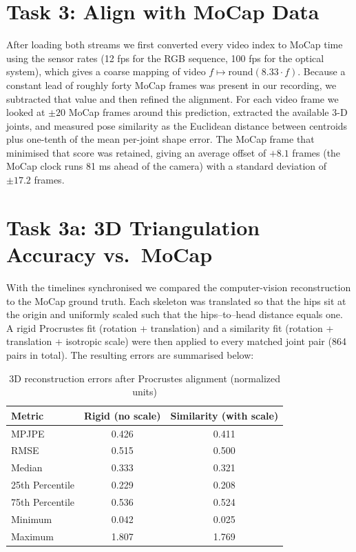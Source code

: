 \documentclass[11pt,a4paper]{article}
\begin{document}
\section*{Task 3: Align with MoCap Data}
After loading both streams we first converted every video index to MoCap time using the sensor rates (12 fps for the RGB sequence, 100 fps for the optical system), which gives a coarse mapping of video \(f \mapsto \mathrm{round}(8.33 \cdot f)\). Because a constant lead of roughly forty MoCap frames was present in our recording, we subtracted that value and then refined the alignment. For each video frame we looked at \(\pm 20\) MoCap frames around this prediction, extracted the available 3-D joints, and measured pose similarity as the Euclidean distance between centroids plus one-tenth of the mean per-joint shape error. The MoCap frame that minimised that score was retained, giving an average offset of \(+8.1\) frames (the MoCap clock runs 81 ms ahead of the camera) with a standard deviation of \(\pm 17.2\) frames.

\section*{Task 3a: 3D Triangulation Accuracy vs.\ MoCap}

With the timelines synchronised we compared the computer-vision reconstruction to the MoCap ground truth. Each skeleton was translated so that the hips sit at the origin and uniformly scaled such that the hips–to–head distance equals one. A rigid Procrustes fit (rotation + translation) and a similarity fit (rotation + translation + isotropic scale) were then applied to every matched joint pair (864 pairs in total). The resulting errors are summarised below:

\begin{table}[htbp]
  \centering
  \caption{3D reconstruction errors after Procrustes alignment (normalized units)}
  \label{tab:triang-vs-mocap}
  \begin{tabular}{lcc}
    \toprule
    \textbf{Metric}   & \textbf{Rigid (no scale)} & \textbf{Similarity (with scale)} \\
    \midrule
    MPJPE            & 0.426                      & 0.411                             \\
    RMSE             & 0.515                      & 0.500                             \\
    Median           & 0.333                      & 0.321                             \\
    25th Percentile  & 0.229                      & 0.208                             \\
    75th Percentile  & 0.536                      & 0.524                             \\
    Minimum          & 0.042                      & 0.025                             \\
    Maximum          & 1.807                      & 1.769                             \\
    \bottomrule
  \end{tabular}
\end{table}
\end{document}
